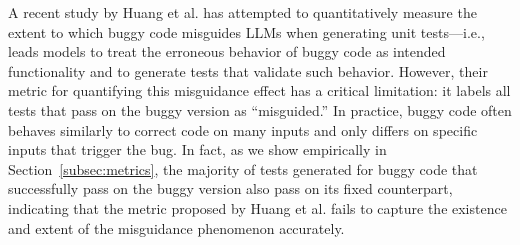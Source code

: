 \documentclass[acmsmall]{acmart}
\begin{document}
A recent study by Huang et al. \cite{huang2025measuringinfluenceincorrectcode} has attempted to quantitatively measure the extent to which buggy code misguides LLMs when generating unit tests—i.e., leads models to treat the erroneous behavior of buggy code as intended functionality and to generate tests that validate such behavior. However, their metric for quantifying this misguidance effect has a critical limitation: it labels all tests that pass on the buggy version as ``misguided.'' In practice, buggy code often behaves similarly to correct code on many inputs and only differs on specific inputs that trigger the bug. In fact, as we show empirically in Section~\ref{subsec:metrics}, the majority of tests generated for buggy code that successfully pass on the buggy version also pass on its fixed counterpart, indicating that the metric proposed by Huang et al. fails to capture the existence and extent of the misguidance phenomenon accurately.
\end{document}
